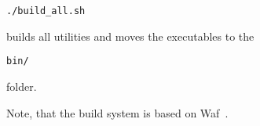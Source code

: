 \begin{exaipd}
\begin{Verbatim}
./build_all.sh
\end{Verbatim}
\end{exaipd}

builds all utilities and moves the executables to the 

\begin{exaipd}
\begin{Verbatim}
bin/
\end{Verbatim}
\end{exaipd}

folder.

Note, that the build system is based on Waf~\cite{waf}.





